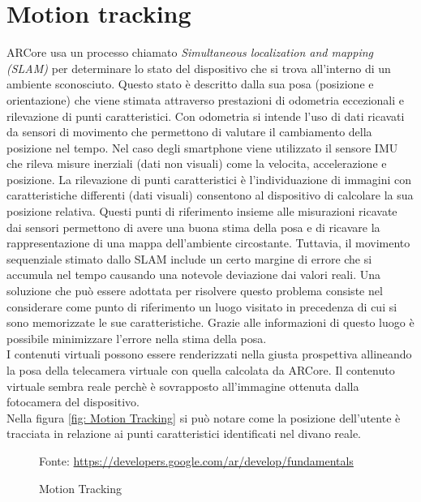\documentclass[crop=false, class=book]{standalone}
\begin{document}
	\section{Motion tracking}
	
		ARCore usa un processo chiamato \emph{Simultaneous localization and mapping (SLAM)} per determinare lo stato del
		dispositivo che si trova all'interno di un ambiente sconosciuto. Questo stato è descritto dalla sua posa (posizione 
		e orientazione) che viene stimata attraverso prestazioni di odometria eccezionali e rilevazione di punti 						caratteristici. Con odometria si intende l'uso di dati ricavati da sensori di movimento che permettono di valutare il 			cambiamento della posizione nel tempo. Nel caso degli smartphone viene utilizzato il sensore IMU che 							rileva misure inerziali (dati non visuali) come la velocita, accelerazione e posizione. La rilevazione di punti					caratteristici è l'individuazione di immagini con caratteristiche differenti (dati visuali) 									consentono al dispositivo di calcolare la sua posizione relativa. Questi punti di riferimento insieme alle misurazioni 			ricavate dai sensori permettono di avere una buona stima della posa e di ricavare la rappresentazione di una mappa 				dell'ambiente circostante. Tuttavia, il movimento sequenziale stimato dallo SLAM include un certo margine di errore che 		si accumula nel tempo causando una notevole deviazione dai valori reali. Una soluzione che può essere adottata per 				risolvere questo problema consiste nel considerare come punto di riferimento un luogo visitato in precedenza di cui si 			sono memorizzate le sue caratteristiche. Grazie alle informazioni di questo luogo è possibile minimizzare l'errore 				nella stima della posa.\\
		I contenuti virtuali possono essere renderizzati nella giusta prospettiva allineando la posa della telecamera virtuale 			con quella calcolata da ARCore. Il contenuto virtuale sembra reale perchè è sovrapposto all'immagine ottenuta dalla 			fotocamera del dispositivo.\\
		Nella figura \vref{fig: Motion Tracking} si può notare come la posizione dell'utente è tracciata in relazione ai punti 			caratteristici identificati nel divano reale.
		
		\begin{figure}
				\centering
				{Fonte: \url{https://developers.google.com/ar/develop/fundamentals}}
				\caption{Motion Tracking}
				\label{fig: Motion Tracking}
		\end{figure}
		
\end{document}
